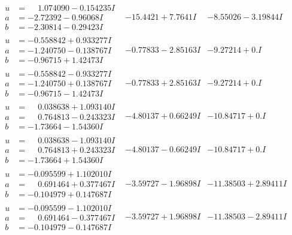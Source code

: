 \documentclass[1p]{elsarticle_modified}
\theoremstyle{definition}
\begin{document}
$$\begin{array}{c|c|c}
\begin{aligned}
u &= \phantom{-}1.074090 - 0.154235 I \\
a &= -2.72392 - 0.96068 I \\
b &= -2.30814 - 0.29423 I\end{aligned}
 & -15.4421 + 7.7641 I & -8.55026 - 3.19844 I \\ \hline\begin{aligned}
u &= -0.558842 + 0.933277 I \\
a &= -1.240750 - 0.138767 I \\
b &= -0.96715 + 1.42473 I\end{aligned}
 & -0.77833 - 2.85163 I & -9.27214 + 0. I\phantom{ +0.000000I} \\ \hline\begin{aligned}
u &= -0.558842 - 0.933277 I \\
a &= -1.240750 + 0.138767 I \\
b &= -0.96715 - 1.42473 I\end{aligned}
 & -0.77833 + 2.85163 I & -9.27214 + 0. I\phantom{ +0.000000I} \\ \hline\begin{aligned}
u &= \phantom{-}0.038638 + 1.093140 I \\
a &= \phantom{-}0.764813 - 0.243323 I \\
b &= -1.73664 - 1.54360 I\end{aligned}
 & -4.80137 + 0.66249 I & -10.84717 + 0. I\phantom{ +0.000000I} \\ \hline\begin{aligned}
u &= \phantom{-}0.038638 - 1.093140 I \\
a &= \phantom{-}0.764813 + 0.243323 I \\
b &= -1.73664 + 1.54360 I\end{aligned}
 & -4.80137 - 0.66249 I & -10.84717 + 0. I\phantom{ +0.000000I} \\ \hline\begin{aligned}
u &= -0.095599 + 1.102010 I \\
a &= \phantom{-}0.691464 + 0.377467 I \\
b &= -0.104979 + 0.147687 I\end{aligned}
 & -3.59727 - 1.96898 I & -11.38503 + 2.89411 I \\ \hline\begin{aligned}
u &= -0.095599 - 1.102010 I \\
a &= \phantom{-}0.691464 - 0.377467 I \\
b &= -0.104979 - 0.147687 I\end{aligned}
 & -3.59727 + 1.96898 I & -11.38503 - 2.89411 I \\ \hline\begin{aligned}

\end{aligned}
\end{array}$$
\end{document}
